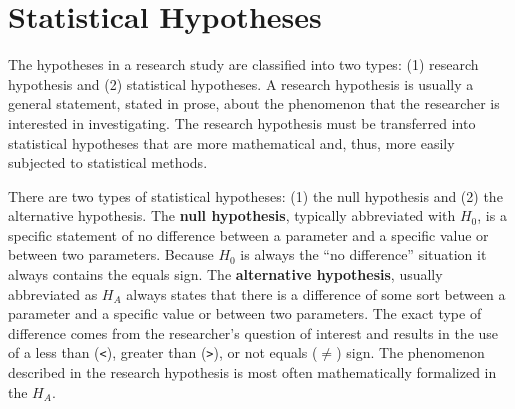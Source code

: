 \documentclass[10pt,openany]{book}\usepackage[]{graphicx}\usepackage[]{color}
\begin{document}
\section{Statistical Hypotheses} \label{sec:Hypotheses}
The hypotheses in a research study are classified into two types: (1) research hypothesis and (2) statistical hypotheses.  A research hypothesis is usually a general statement, stated in prose, about the phenomenon that the researcher is interested in investigating.  The research hypothesis must be transferred into statistical hypotheses that are more mathematical and, thus, more easily subjected to statistical methods.


\vspace{-12pt}

There are two types of statistical hypotheses: (1) the null hypothesis and (2) the alternative hypothesis.  The \textbf{null hypothesis}, typically abbreviated with $H_{0}$, is a specific statement of no difference between a parameter and a specific value or between two parameters.  Because $H_{0}$ is always the ``no difference'' situation it always contains the equals sign.  The \textbf{alternative hypothesis}, usually abbreviated as $H_{A}$ always states that there is a difference of some sort between a parameter and a specific value or between two parameters.  The exact type of difference comes from the researcher's question of interest and results in the use of a less than (\verb"<"), greater than (\verb">"), or not equals ($\neq$) sign.  The phenomenon described in the research hypothesis is most often mathematically formalized in the $H_{A}$.


\vspace{-12pt}

\vspace{-12pt}
\end{document}
